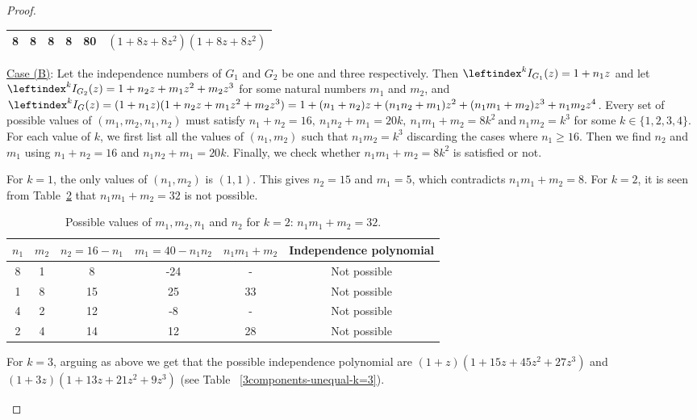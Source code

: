 \documentclass[12pt,a4paper]{article}
\theoremstyle{plain}
\newcounter{cases}
\numberwithin{equation}{section}
\begin{document}
\begin{proof}
\begin{enumerate}
\begin{table}[h!]
\begin{tabular}{|c|c|c|c|c|c|}
       8 & 8 & 8 & 8  & 80 & $(1+8z+8z^2)(1+8z+8z^2)$\\
       \hline
    \end{tabular}
    \label{2components-equalindnumb-k=4}
\end{table}
\FloatBarrier
\par \underline{Case (B)}: 
Let  the independence numbers of $G_1$ and $G_2$ be one and  three respectively. Then \(\leftindex^k{I}_{G_1}(z) = 1+n_1z\) and let \(\leftindex^k{I}_{G_2}(z) = 1+ n_2z + m_1z^2 + m_2z^3\)  for some natural numbers \(m_1\) and \(m_2\), and  
    $\leftindex^k{I}_G(z) = (1+n_1z)(1+n_2z+m_1z^2+m_2z^3) = 1 + (n_1+n_2)z + (n_1n_2+m_1)z^2 + (n_1m_1+m_2)z^3 + n_1m_2z^4$. Every set of possible values of \((m_1, m_2, n_1, n_2) \) must satisfy \(n_1+n_2 = 16,~ n_1n_2+m_1 = 20k,~ n_1m_1+ m_2 = 8k^2 ~ \text{and}~ n_1m_2 = k^3\)
for some \(k \in \{1, 2, 3, 4\}\). For each value of \(k\), we first list all the values of \((n_1, m_2)\) such that $n_1 m_2=k^3$ discarding the cases where \(n_1\geq 16\). Then we find $n_2$ and $m_1$ using $n_1 +n_2 =16$ and $n_1 n_2 +m_1=20k$. Finally, we check whether $ n_1m_1+ m_2 = 8k^2$ is satisfied or not.
\par
For \(k=1\), the only values of \((n_1, m_2)\) is \((1,1)\). This gives \(n_2=15\) and \(m_1=5\), which contradicts $n_1 m_1 +m_2 =8$. For $k=2$, it is seen from Table~\ref{3components-unequal-k=2} that $n_1m_1 + m_2=32$ is not possible.
\begin{table}[h!]
\centering
    \caption{Possible values of $m_1, m_2, n_1$ and $n_2$ for $k=2$: $n_1m_1 + m_2=32$. }
    \begin{tabular}{|c|c|c|c|c|c|}
    \hline
      $n_1$ & $m_2$ & $n_2=16-n_1$ & $m_1 =40-n_1 n_2$ & $n_1m_1 + m_2 $ & Independence polynomial \\
      \hline
       8 & 1 & 8 & -24 & - & Not possible\\ \hline
       1 & 8 & 15 & 25 & 33 & Not possible\\ \hline
       4 & 2 & 12 & -8  & - & Not possible\\ \hline
       2 & 4 & 14 & 12  & 28 & Not possible\\ \hline
    \end{tabular}
    \label{3components-unequal-k=2}
\end{table}
For $k = 3$, arguing as above we get that the possible independence polynomial are $ (1+z)(1+15z+45z^2+27z^3)$ and $(1+3z)(1+13z+21z^2+9z^3)$ (see Table ~\ref{3components-unequal-k=3}).

\end{enumerate}
\end{proof}
\end{document}
